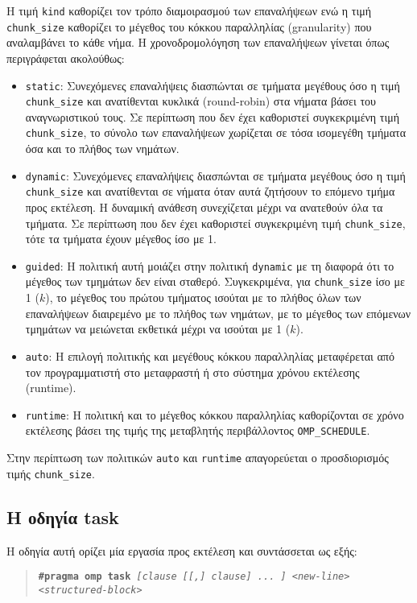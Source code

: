 Η τιμή \texttt{kind} καθορίζει τον τρόπο διαμοιρασμού των επαναλήψεων ενώ η τιμή \texttt{chunk\_size} καθορίζει το μέγεθος του κόκκου παραλληλίας (granularity) που αναλαμβάνει το κάθε νήμα. Η χρονοδρομολόγηση των επαναλήψεων γίνεται όπως περιγράφεται ακολούθως:
\begin{itemize}
	\item \texttt{static}: Συνεχόμενες επαναλήψεις διασπώνται σε τμήματα μεγέθους όσο η τιμή \texttt{chunk\_size} και ανατίθενται κυκλικά (round-robin) στα νήματα βάσει του αναγνωριστικού τους. Σε περίπτωση που δεν έχει καθοριστεί συγκεκριμένη τιμή \texttt{chunk\_size}, το σύνολο των επαναλήψεων χωρίζεται σε τόσα ισομεγέθη τμήματα όσα και το πλήθος των νημάτων.
	\item \texttt{dynamic}: Συνεχόμενες επαναλήψεις διασπώνται σε τμήματα μεγέθους όσο η τιμή \texttt{chunk\_size} και ανατίθενται σε νήματα όταν αυτά ζητήσουν το επόμενο τμήμα προς εκτέλεση. Η δυναμική ανάθεση συνεχίζεται μέχρι να ανατεθούν όλα τα τμήματα. Σε περίπτωση που δεν έχει καθοριστεί συγκεκριμένη τιμή \texttt{chunk\_size}, τότε τα τμήματα έχουν μέγεθος ίσο με 1.
	\item \texttt{guided}: Η πολιτική αυτή μοιάζει στην πολιτική \texttt{dynamic} με τη διαφορά ότι το μέγεθος των τμημάτων δεν είναι σταθερό. Συγκεκριμένα, για \texttt{chunk\_size} ίσο με 1 ($k$), το μέγεθος του πρώτου τμήματος ισούται με το πλήθος όλων των επαναλήψεων διαιρεμένο με το πλήθος των νημάτων, με το μέγεθος των επόμενων τμημάτων να μειώνεται εκθετικά μέχρι να ισούται με 1 ($k$).
	\item \texttt{auto}: Η επιλογή πολιτικής και μεγέθους κόκκου παραλληλίας μεταφέρεται από τον προγραμματιστή στο μεταφραστή ή στο σύστημα χρόνου εκτέλεσης (runtime).
	\item \texttt{runtime}: Η πολιτική και το μέγεθος κόκκου παραλληλίας καθορίζονται σε χρόνο εκτέλεσης βάσει της τιμής της μεταβλητής περιβάλλοντος \texttt{OMP\_SCHEDULE}.
\end{itemize}

Στην περίπτωση των πολιτικών \texttt{auto} και \texttt{runtime} απαγορεύεται ο προσδιορισμός τιμής \texttt{chunk\_size}.

\subsection{Η οδηγία task}
Η οδηγία αυτή ορίζει μία εργασία προς εκτέλεση και συντάσσεται ως εξής:
\begin{quote}
	\texttt{\textbf{\#pragma omp task} \textit{[clause [[,] clause] ... ] <new-line>}} \\
		\texttt{\textit{<structured-block>}}
\end{quote}

